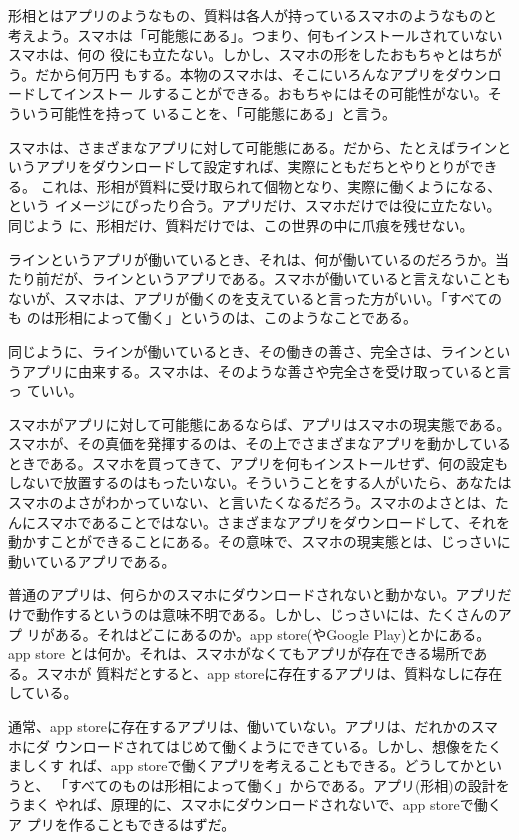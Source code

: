 \documentclass[paper=a4paper,fontsize=10pt,jafontsize=9pt,titlepage]{jlreq}
\begin{document}
形相とはアプリのようなもの、質料は各人が持っているスマホのようなものと
考えよう。スマホは「可能態にある」。つまり、何もインストールされていないスマホは、何の
役にも立たない。しかし、スマホの形をしたおもちゃとはちがう。だから何万円
もする。本物のスマホは、そこにいろんなアプリをダウンロードしてインストー
ルすることができる。おもちゃにはその可能性がない。そういう可能性を持って
いることを、「可能態にある」と言う。

スマホは、さまざまなアプリに対して可能態にある。だから、たとえばラインと
いうアプリをダウンロードして設定すれば、実際にともだちとやりとりができる。
これは、形相が質料に受け取られて個物となり、実際に働くようになる、という
イメージにぴったり合う。アプリだけ、スマホだけでは役に立たない。同じよう
に、形相だけ、質料だけでは、この世界の中に爪痕を残せない。

ラインというアプリが働いているとき、それは、何が働いているのだろうか。当
たり前だが、ラインというアプリである。スマホが働いていると言えないことも
ないが、スマホは、アプリが働くのを支えていると言った方がいい。「すべてのも
のは形相によって働く」というのは、このようなことである。

同じように、ラインが働いているとき、その働きの善さ、完全さは、ラインとい
うアプリに由来する。スマホは、そのような善さや完全さを受け取っていると言っ
ていい。

スマホがアプリに対して可能態にあるならば、アプリはスマホの現実態である。
スマホが、その真価を発揮するのは、その上でさまざまなアプリを動かしている
ときである。スマホを買ってきて、アプリを何もインストールせず、何の設定も
しないで放置するのはもったいない。そういうことをする人がいたら、あなたは
スマホのよさがわかっていない、と言いたくなるだろう。スマホのよさとは、た
んにスマホであることではない。さまざまなアプリをダウンロードして、それを
動かすことができることにある。その意味で、スマホの現実態とは、じっさいに
動いているアプリである。


普通のアプリは、何らかのスマホにダウンロードされないと動かない。アプリだ
けで動作するというのは意味不明である。しかし、じっさいには、たくさんのアプ
リがある。それはどこにあるのか。app store(やGoogle Play)とかにある。app store
とは何か。それは、スマホがなくてもアプリが存在できる場所である。スマホが
質料だとすると、app storeに存在するアプリは、質料なしに存在している。

通常、app storeに存在するアプリは、働いていない。アプリは、だれかのスマホにダ
ウンロードされてはじめて働くようにできている。しかし、想像をたくましくす
れば、app storeで働くアプリを考えることもできる。どうしてかというと、
「すべてのものは形相によって働く」からである。アプリ(形相)の設計をうまく
やれば、原理的に、スマホにダウンロードされないで、app storeで働くア
プリを作ることもできるはずだ。
\end{document}
